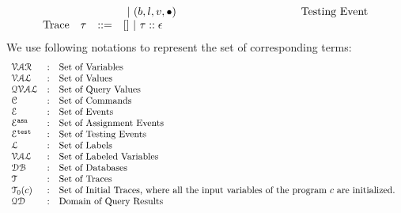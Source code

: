 \[\begin{array}{llll}
&&& ~|~(\bexpr, l, v, \bullet)   ~~~~~~~~~~~~~~~~~~~~~~~~~~~~~~~~~~ \mbox{Testing Event}
\\
%
%
\mbox{Trace} & \trace
& ::= & [] ~|~ \trace :: \event\\
\end{array}
\]
We use following notations to represent the set of corresponding terms:
\[
\begin{array}{lll}
\mathcal{VAR} & : & \mbox{Set of Variables}  
\\ 
%
\mathcal{VAL} & : & \mbox{Set of Values} 
\\ 
%
\mathcal{QVAL} & : & \mbox{Set of Query Values} 
\\ 
%
\cdom & : & \mbox{Set of Commands} 
\\ 
%
\eventset  & : & \mbox{Set of Events}  
\\
%
\eventset^{\asn}  & : & \mbox{Set of Assignment Events}  
\\
%
\eventset^{\test}  & : & \mbox{Set of Testing Events}  
\\
%
\ldom  & : & \mbox{Set of Labels}  
\\
\mathcal{VAL}  & : & \mbox{Set of Labeled Variables}  
\\
\dbdom  & : & \mbox{{Set of Databases}} 
\\
%
{\mathcal{T}} & : & \mbox{Set of Traces}
\\
%
\mathcal{T}_0(c) & : & \mbox{Set of Initial Traces, where all the input variables of the program $c$ are initialized.
}
\\
%
\qdom & : & \mbox{{Domain of Query Results}}\\
\end{array}
\]
